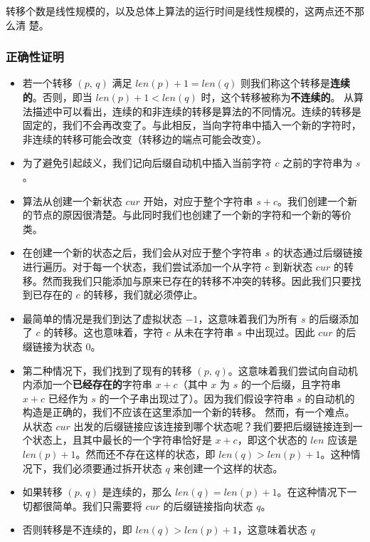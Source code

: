 转移个数是线性规模的，以及总体上算法的运行时间是线性规模的，这两点还不那么清
楚。

\subsubsection{正确性证明}

\begin{itemize}
\item
  若一个转移 \((p,\,q)\) 满足 \(len(p)+1=len(q)\)
  则我们称这个转移是\textbf{连续的}。否则，即当 \(len(p)+1<len(q)\)
  时，这个转移被称为\textbf{不连续的}。
  从算法描述中可以看出，连续的和非连续的转移是算法的不同情况。连续的转移是固定的，我们不会再改变了。与此相反，当向字符串中插入一个新的字符时，非连续的转移可能会改变（转移边的端点可能会改变）。
\item
  为了避免引起歧义，我们记向后缀自动机中插入当前字符 \(c\)
  之前的字符串为 \(s\)。
\item
  算法从创建一个新状态 \(cur\) 开始，对应于整个字符串
  \(s+c\)。我们创建一个新的节点的原因很清楚。与此同时我们也创建了一个新的字符和一个新的等价类。
\item
  在创建一个新的状态之后，我们会从对应于整个字符串 \(s\)
  的状态通过后缀链接进行遍历。对于每一个状态，我们尝试添加一个从字符
  \(c\) 到新状态 \(cur\)
  的转移。然而我我们只能添加与原来已存在的转移不冲突的转移。因此我们只要找到已存在的
  \(c\) 的转移，我们就必须停止。
\item
  最简单的情况是我们到达了虚拟状态 \(-1\)，这意味着我们为所有 \(s\)
  的后缀添加了 \(c\) 的转移。这也意味着，字符 \(c\) 从未在字符串 \(s\)
  中出现过。因此 \(cur\) 的后缀链接为状态 \(0\)。
\item
  第二种情况下，我们找到了现有的转移
  \((p,\,q)\)。这意味着我们尝试向自动机内添加一个\textbf{已经存在的}字符串
  \(x+c\)（其中 \(x\) 为 \(s\) 的一个后缀，且字符串 \(x+c\) 已经作为
  \(s\) 的一个子串出现过了）。因为我们假设字符串 \(s\)
  的自动机的构造是正确的，我们不应该在这里添加一个新的转移。
  然而，有一个难点。从状态 \(cur\)
  出发的后缀链接应该连接到哪个状态呢？我们要把后缀链接连到一个状态上，且其中最长的一个字符串恰好是
  \(x+c\)，即这个状态的 \(len\) 应该是
  \(len(p)+1\)。然而还不存在这样的状态，即
  \(len(q)>len(p)+1\)。这种情况下，我们必须要通过拆开状态 \(q\)
  来创建一个这样的状态。
\item
  如果转移 \((p,\,q)\) 是连续的，那么
  \(len(q)=len(p)+1\)。在这种情况下一切都很简单。我们只需要将 \(cur\)
  的后缀链接指向状态 \(q\)。
\item
  否则转移是不连续的，即 \(len(q)>len(p)+1\)，这意味着状态 \(q\)

\end{itemize}
